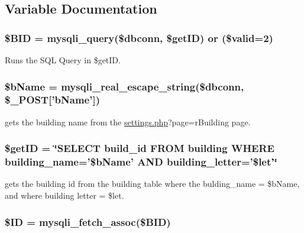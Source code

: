 \subsection{\-Variable \-Documentation}
\hypertarget{rmBuilding_8php_a7458cf5c1cfaeb93fe055362ecff999e}{
\subsubsection[{\$\-B\-I\-D}]{\setlength{\rightskip}{0pt plus 5cm}\$\-B\-I\-D = mysqli\-\_\-query(\$dbconn, \$get\-I\-D) or (\$valid=2)}}\label{rmBuilding_8php_a7458cf5c1cfaeb93fe055362ecff999e}
\-Runs the \-S\-Q\-L \-Query in \$get\-I\-D. \hypertarget{rmBuilding_8php_adda32c78f7f7aed9a0f7bb03a9198e9c}{
\subsubsection[{\$b\-Name}]{\setlength{\rightskip}{0pt plus 5cm}\$b\-Name = mysqli\-\_\-real\-\_\-escape\-\_\-string(\$dbconn, \$\-\_\-\-P\-O\-S\-T\mbox{[}'b\-Name'\mbox{]})}}\label{rmBuilding_8php_adda32c78f7f7aed9a0f7bb03a9198e9c}
gets the building name from the \hyperlink{settings_8php}{settings.\-php}?page=r\-Building page. \hypertarget{rmBuilding_8php_aae30003a4d3fab7dc75a19cbfddea7a8}{
\subsubsection[{\$get\-I\-D}]{\setlength{\rightskip}{0pt plus 5cm}\$get\-I\-D = \char`\"{}\-S\-E\-L\-E\-C\-T build\-\_\-id \-F\-R\-O\-M building \-W\-H\-E\-R\-E building\-\_\-name='\$b\-Name' \-A\-N\-D building\-\_\-letter='\$let'\char`\"{}}}\label{rmBuilding_8php_aae30003a4d3fab7dc75a19cbfddea7a8}
gets the building id from the building table where the bulding\-\_\-name = \$b\-Name, and where building letter = \$let. \hypertarget{rmBuilding_8php_a68d2e459193313b71494801a69ade623}{
\subsubsection[{\$\-I\-D}]{\setlength{\rightskip}{0pt plus 5cm}\$\-I\-D = mysqli\-\_\-fetch\-\_\-assoc(\$\-B\-I\-D)}}\label{rmBuilding_8php_a68d2e459193313b71494801a69ade623}
